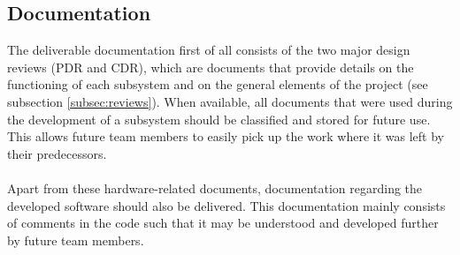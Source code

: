\subsection{Documentation}
%
The deliverable documentation first of all consists of the two major design reviews (\ac{PDR} and \ac{CDR}), which are documents that provide details on the functioning of each subsystem and on the general elements of the project (see subsection \ref{subsec:reviews}). When available, all documents that were used during the development of a subsystem should be classified and stored for future use. This allows future team members to easily pick up the work where it was left by their predecessors.
\\
\\
Apart from these hardware-related documents, documentation regarding the developed software should also be delivered. This documentation mainly consists of comments in the code such that it may be understood and developed further by future team members.